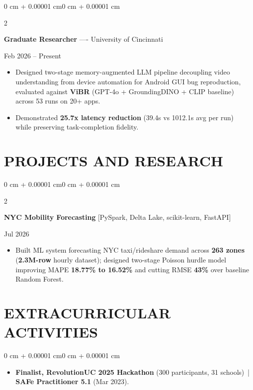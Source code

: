 \documentclass[10pt, letterpaper]{article}
\newenvironment{highlights}{
    \begin{itemize}[
        topsep=0.10 cm,
        parsep=0.06 cm,
        partopsep=0pt,
        itemsep=0.06 cm,
        leftmargin=12pt
    ]
}{
    \end{itemize}
}
\newenvironment{onecolentry}{
    \begin{adjustwidth}{0 cm + 0.00001 cm}{0 cm + 0.00001 cm}
}{
    \end{adjustwidth}
}
\newenvironment{twocolentry}[2][]{
    \onecolentry
    \def\secondColumn{#2}
    \setcolumnwidth{\fill, 4.5 cm}
    \begin{paracol}{2}
}{
    \switchcolumn \raggedleft \secondColumn
    \end{paracol}
    \endonecolentry
}
\begin{document}
\begin{twocolentry}{Feb 2026 -- Present}
\textbf{Graduate Researcher} ---- University of Cincinnati
\end{twocolentry}
\begin{highlights}
  \item Designed two-stage memory-augmented LLM pipeline decoupling video understanding from device automation for Android GUI bug reproduction, evaluated against \textbf{ViBR} (GPT-4o + GroundingDINO + CLIP baseline) across 53 runs on 20+ apps.
  \item Demonstrated \textbf{25.7x latency reduction} (39.4s vs 1012.1s avg per run) while preserving task-completion fidelity.
\end{highlights}

\section{PROJECTS AND RESEARCH}
\begin{twocolentry}{Jul 2026}
\textbf{NYC Mobility Forecasting} [PySpark, Delta Lake, scikit-learn, FastAPI]
\end{twocolentry}
\begin{highlights}
  \item Built ML system forecasting NYC taxi/rideshare demand across \textbf{263 zones} (\textbf{2.3M-row} hourly dataset); designed two-stage Poisson hurdle model improving MAPE \textbf{18.77\% to 16.52\%} and cutting RMSE \textbf{43\%} over baseline Random Forest.
\end{highlights}

\vspace{0.12 cm}

\section{EXTRACURRICULAR ACTIVITIES}
\begin{onecolentry}
\begin{highlights}
  \item \textbf{Finalist, RevolutionUC 2025 Hackathon} (300 participants, 31 schools) \,|\, \textbf{SAFe Practitioner 5.1} (Mar 2023).
\end{highlights}
\end{onecolentry}
\end{document}
